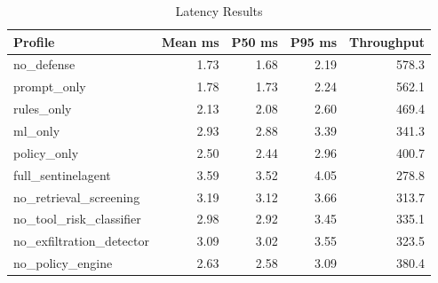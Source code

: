 \begin{table}[t]
\centering
\caption{Latency Results}
\begin{tabular}{lrrrr}
\toprule
Profile & Mean ms & P50 ms & P95 ms & Throughput \\
\midrule
no\_defense & 1.73 & 1.68 & 2.19 & 578.3 \\
prompt\_only & 1.78 & 1.73 & 2.24 & 562.1 \\
rules\_only & 2.13 & 2.08 & 2.60 & 469.4 \\
ml\_only & 2.93 & 2.88 & 3.39 & 341.3 \\
policy\_only & 2.50 & 2.44 & 2.96 & 400.7 \\
full\_sentinelagent & 3.59 & 3.52 & 4.05 & 278.8 \\
no\_retrieval\_screening & 3.19 & 3.12 & 3.66 & 313.7 \\
no\_tool\_risk\_classifier & 2.98 & 2.92 & 3.45 & 335.1 \\
no\_exfiltration\_detector & 3.09 & 3.02 & 3.55 & 323.5 \\
no\_policy\_engine & 2.63 & 2.58 & 3.09 & 380.4 \\
\bottomrule
\end{tabular}
\end{table}
